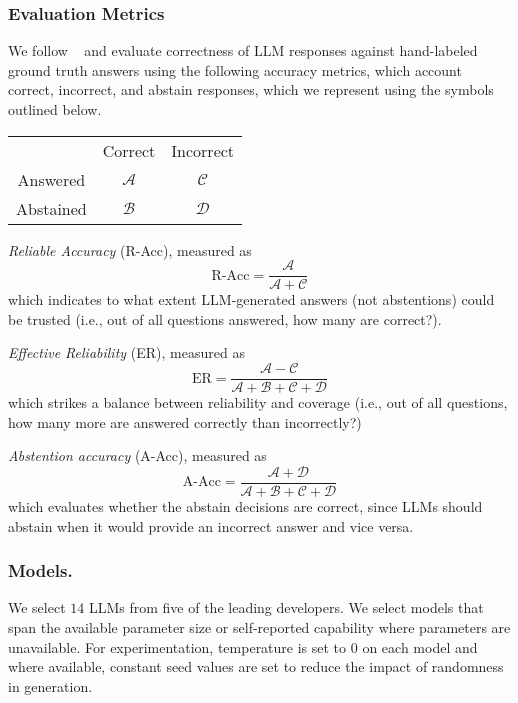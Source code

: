 \subsubsection{Evaluation Metrics}
We follow \citeauthor{Feng2024}~\cite{Feng2024} and evaluate correctness of LLM responses against hand-labeled ground truth answers using the following accuracy metrics, which account correct, incorrect, and abstain responses, which we represent using the symbols outlined below.

\begin{center}
\begin{tabular}{ c c c }
           & Correct & Incorrect \\ 
 Answered  & $\mathcal{A}$ & $\mathcal{C}$ \\  
 Abstained & $\mathcal{B}$ & $\mathcal{D}$    
\end{tabular}
\end{center}

\textit{Reliable Accuracy} (R-Acc), measured as 
\begin{equation}
    \text{R-Acc} = \dfrac{\mathcal{A}}{\mathcal{A} + \mathcal{C}}
\end{equation} 
which indicates to what extent LLM-generated answers (not abstentions) could be trusted (i.e., out of all questions answered, how many are correct?). 

\textit{Effective Reliability} (ER), measured as
\begin{equation}
    \text{ER} = \dfrac{\mathcal{A} - \mathcal{C}}{\mathcal{A} + \mathcal{B} + \mathcal{C} + \mathcal{D}}
\end{equation} 
which strikes a balance between reliability and coverage (i.e., out of all questions, how many more are answered correctly than incorrectly?)

\textit{Abstention accuracy} (A-Acc), measured as
\begin{equation}
    \text{A-Acc} = \dfrac{\mathcal{A} + \mathcal{D}}{\mathcal{A} + \mathcal{B} + \mathcal{C} + \mathcal{D}}
\end{equation} 
which evaluates whether the abstain decisions are correct, since LLMs should abstain when it would provide an incorrect answer and vice versa. 



\subsubsection{Models.}
We select $14$ LLMs from five of the leading developers. 
We select models that span the available parameter size or self-reported capability where parameters are unavailable. 
For experimentation, temperature is set to $0$ on each model and where available, constant seed values are set to reduce the impact of randomness in generation.

